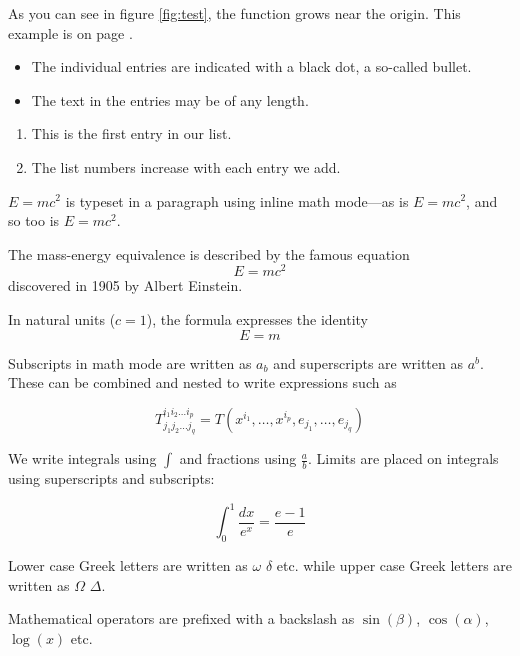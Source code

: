 \documentclass[12pt, a4paper]{article} %
\begin{document}
    As you can see in figure \ref{fig:test},
    the function grows near the origin.
    This example is on page \pageref{fig:test}.

    \begin{itemize}                                        %
        \item The individual entries are indicated with
              a black dot, a so-called bullet.
        \item The text in the entries may be of any length.
    \end{itemize}

    \begin{enumerate}                                      %
        \item This is the first entry in our list.
        \item The list numbers increase with each entry we add.
    \end{enumerate}

    \begin{math}                                           %
        E=mc^2
    \end{math} is typeset in a paragraph using inline math mode---as is $E=mc^2$, and so too is \(E=mc^2\).

    The mass-energy equivalence is described by the famous equation
    \[ E=mc^2 \] discovered in 1905 by Albert Einstein.

    In natural units ($c = 1$), the formula expresses the identity
    \begin{equation}
        E=m
    \end{equation}

    Subscripts in math mode are written as $a_b$ and superscripts are written as $a^b$. These can be combined and nested to write expressions such as

    \[ T^{i_1 i_2 \dots i_p}_{j_1 j_2 \dots j_q} = T(x^{i_1},\dots,x^{i_p},e_{j_1},\dots,e_{j_q}) \]

    We write integrals using $\int$ and fractions using $\frac{a}{b}$. Limits are placed on integrals using superscripts and subscripts:

    \[ \int_0^1 \frac{dx}{e^x} =  \frac{e-1}{e} \]

    Lower case Greek letters are written as $\omega$ $\delta$ etc. while upper case Greek letters are written as $\Omega$ $\Delta$.

    Mathematical operators are prefixed with a backslash as $\sin(\beta)$, $\cos(\alpha)$, $\log(x)$ etc.
\end{document}
